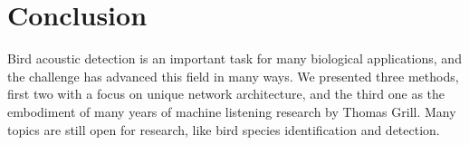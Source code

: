 \documentclass[10pt,twocolumn,letterpaper]{article}
\begin{document}
\section{Conclusion}

Bird acoustic detection is an important task for many biological
applications, and the challenge has advanced this field in many ways. We
presented three methods, first two with a focus on unique network
architecture, and the third one as the embodiment of many years of machine
listening research by Thomas Grill. Many topics are still open for
research, like bird species identification and detection. 


{\small   }
\end{document}

